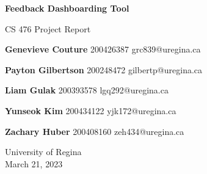 \begin{titlepage}
    \begin{center}
        \vspace*{2.5cm}
 
        \textbf{Feedback Dashboarding Tool}
 
        \vspace{0.5cm}
        CS 476 Project Report
 
         \vfill
        
 
        \textbf{Genevieve Couture}
        200426387 grc839@uregina.ca
 
        \textbf{Payton Gilbertson}
        200248472 gilbertp@uregina.ca
 
        \textbf{Liam Gulak}
        200393578 lgq292@uregina.ca
 
        \textbf{Yunseok Kim}
        200434122 yjk172@uregina.ca
 
        \textbf{Zachary Huber}
        200408160 zeh434@uregina.ca
 
        \vspace{1.5cm}  
             
        \vspace{0.8cm}
      
             
        University of Regina\\
        March 21, 2023
             
    \end{center}
 \end{titlepage}